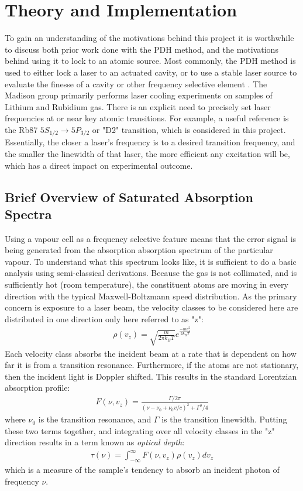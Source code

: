 \newpage
\section{Theory and Implementation} \label{sec:theory}

To gain an understanding of the motivations behind this project it is worthwhile
to discuss both prior work done with the PDH method, and the motivations behind
using it to lock to an atomic source. Most commonly, the PDH method is used to
either lock a laser to an actuated cavity, or to use a stable laser source to
evaluate the finesse of a cavity or other frequency selective element
\cite{black1998}. The Madison group primarily performs laser cooling experiments
on samples of Lithium and Rubidium gas. There is an explicit need to
precisely set laser frequencies at or near key atomic transitions. For example,
a useful reference is the Rb87 $5S_{1/2} \rightarrow 5P_{3/2}$ or "D2"
transition, which is considered in this project. Essentially, the closer a
laser's frequency
is to a desired transition frequency, and the smaller the linewidth of that
laser, the more efficient any excitation will be, which has a direct impact on
experimental outcome.

\subsection{Brief Overview of Saturated Absorption Spectra}

Using a vapour cell as a frequency selective feature means that the error signal
is being generated from the absorption absorption spectrum of the particular
vapour. To understand what this spectrum looks like, it is sufficient to do a
basic analysis using semi-classical derivations. Because the gas is not
collimated, and is sufficiently hot (room temperature), the constituent
atoms are moving in every direction with the typical Maxwell-Boltzmann speed
distribution. As the primary concern is exposure to a laser beam, the
velocity classes to be considered here are distributed in one direction only
here referred to as "z":
\begin{gather}
  \rho(v_z) = \sqrt{\frac{m}{2\pi k_B T}} e^{\frac{-m v_z^2}{2k_B T}}
\end{gather}
Each velocity class absorbs the incident beam at a rate that is dependent on
how far it is from a transition resonance. Furthermore, if the atoms are not
stationary, then the incident light is Doppler shifted. This results in the
standard Lorentzian absorption profile:
\begin{gather}
  F(\nu, v_z) = \frac{\Gamma / 2 \pi}{(\nu - \nu_0 + \nu_0 v / c)^2 +
  \Gamma^2 / 4}
\end{gather}
where $\nu_0$ is the transition resonance, and $\Gamma$ is the transition
linewidth. Putting these two terms together, and integrating over all velocity
classes in the "z" direction results in a term known as \emph{optical depth}:
\begin{gather}
  \tau(\nu) = \int_{-\infty}^\infty F(\nu, v_z) \rho(v_z) dv_z
\end{gather}
which is a measure of the sample's tendency to absorb an incident photon of
frequency $\nu$. \\

